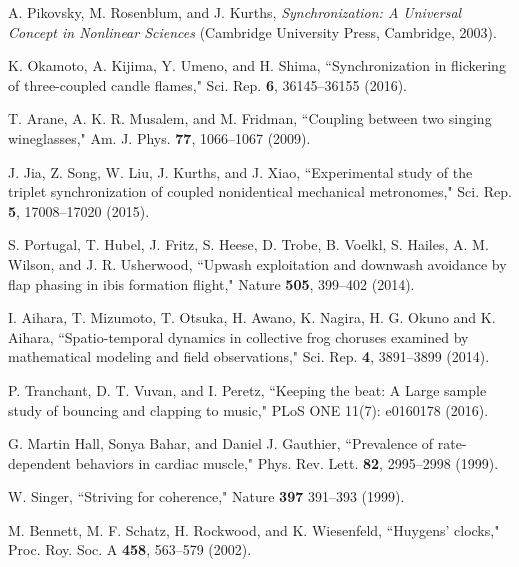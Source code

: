 \documentclass[preprint,showpacs,preprintnumbers,amsmath,amssymb,aps,prb]{revtex4-1}
\theoremstyle{remark}
\begin{document}
\begin{thebibliography}{99}

 A. Pikovsky, M. Rosenblum, and J. Kurths, {\it Synchronization: A Universal Concept in Nonlinear Sciences} (Cambridge University Press, Cambridge, 2003).
  
 K. Okamoto, A. Kijima, Y. Umeno, and H. Shima, ``Synchronization in flickering of three-coupled candle flames," Sci. Rep. {\bf 6}, 36145--36155 (2016).

 T. Arane, A. K. R. Musalem, and M. Fridman, ``Coupling between two singing wineglasses," Am. J. Phys. {\bf 77}, 1066--1067 (2009). %
  
  J. Jia, Z. Song, W. Liu, J. Kurths, and J. Xiao, ``Experimental study of the triplet synchronization of coupled nonidentical mechanical metronomes," Sci. Rep. {\bf 5}, 17008--17020 (2015).

  
 S. Portugal, T. Hubel, J. Fritz, S. Heese, D. Trobe, B. Voelkl, S. Hailes, A. M. Wilson, and J. R. Usherwood,   ``Upwash exploitation and downwash avoidance by flap phasing in ibis formation flight," Nature {\bf 505}, 399--402 (2014).

   I. Aihara, T. Mizumoto, T. Otsuka, H. Awano, K. Nagira, H. G. Okuno and K. Aihara, ``Spatio-temporal dynamics in collective frog choruses examined by mathematical modeling and field observations," Sci. Rep. {\bf 4}, 3891--3899 (2014). 

   P. Tranchant, D. T. Vuvan, and I. Peretz, ``Keeping the beat: A Large sample study of bouncing and clapping to music," PLoS ONE 11(7): e0160178 (2016).

   G. Martin Hall, Sonya Bahar, and Daniel J. Gauthier, ``Prevalence of rate-dependent behaviors in cardiac muscle," Phys. Rev. Lett. {\bf 82}, 2995--2998 (1999).

   W. Singer, ``Striving for coherence,"  Nature {\bf 397} 391--393 (1999).

   M. Bennett, M. F. Schatz, H. Rockwood, and K. Wiesenfeld, ``Huygens' clocks," Proc. Roy. Soc. A {\bf 458}, 563--579 (2002).


\end{thebibliography}
\end{document}

